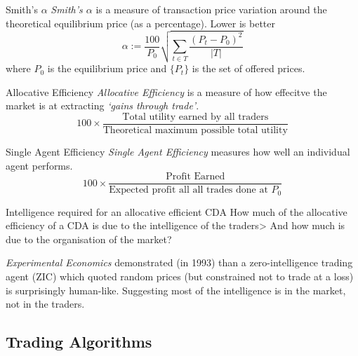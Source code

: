 \documentclass[11pt,a4paper]{article}
\begin{document}
\begin{definition}{Smith's $\alpha$}
  \textit{Smith's $\alpha$} is a measure of transaction price variation around the theoretical equilibrium price (as a percentage). Lower is better
  \[ \alpha:=\frac{100}{P_0}\sqrt{\sum_{t\in T}\frac{(P_t-P_0)^2}{|T|}} \]
  where $P_0$ is the equilibrium price and $\{P_t\}$ is the set of offered prices.
\end{definition}

\begin{definition}{Allocative Efficiency}
  \textit{Allocative Efficiency} is a measure of how effecitve the market is at extracting \textit{`gains through trade'}.
  \[ 100\times\frac{\text{Total utility earned by all traders}}{\text{Theoretical maximum possible total utility}} \]
\end{definition}

\begin{definition}{Single Agent Efficiency}
  \textit{Single Agent Efficiency} measures how well an individual agent performs.
  \[ 100\times\frac{\text{Profit Earned}}{\text{Expected profit all all trades done at }P_0} \]
\end{definition}

\begin{proposition}{Intelligence required for an allocative efficient CDA}
  How much of the allocative efficiency of a CDA is due to the intelligence of the traders> And how much is due to the organisation of the market?
  \par \textit{Experimental Economics} demonstrated (in 1993) than a zero-intelligence trading agent (ZIC) which quoted random prices (but constrained not to trade at a loss) is surprisingly human-like. Suggesting most of the intelligence is in the market, not in the traders.
\end{proposition}

\subsection{Trading Algorithms}
\end{document}
